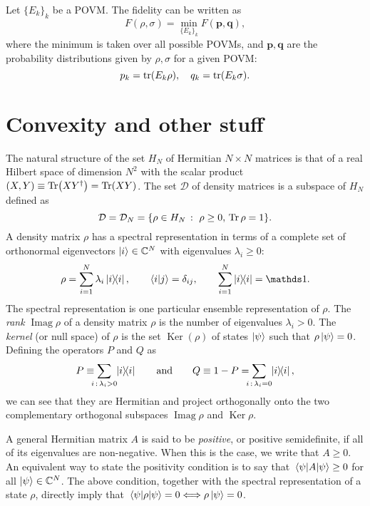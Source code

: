 \documentclass[12pt]{report}
\newcommand{\bs}[1]{\boldsymbol{#1}}
\DeclareMathOperator{\Ker}{Ker}
\DeclareMathOperator{\Imag}{Imag}
\begin{document}
\begin{prop}
	Let $\{E_k\}_k$ be a POVM. The fidelity can be written as
	\begin{equation}
		F(\rho,\sigma)=\min_{\{E_k\}_k} F(\bs p,\bs q),
	\end{equation}
	where the minimum is taken over all possible POVMs, and $\bs p,\bs q$ are the probability distributions given by $\rho,\sigma$ for a given POVM:
	\begin{equation}
		p_k=\tr(E_k \rho),\quad q_k=\tr(E_k \sigma).
	\end{equation}
\end{prop}

\section{Convexity and other stuff}
The natural structure of the set $H_N$ of Hermitian $N\times N$ matrices is that of a real Hilbert space of dimension $N^2$ with the scalar product
$(X, Y) \equiv \Tr(XY^\dagger) = \Tr(XY)$.
The set $\mathcal D$ of density matrices is a subspace of $H_N$ defined as
\begin{equation}
	\mathcal D = \mathcal D_N = \{ \rho \in H_N \,:\,\, \rho \ge 0, \,\Tr\rho=1 \}.
\end{equation}
A density matrix $\rho$ has a spectral representation in terms of a complete set of orthonormal eigenvectors $\ket i \in \mathbb C^N$ with eigenvalues $\lambda_i \ge 0$:
\begin{equation}
	\rho = \sum_{i=1}^N \lambda_i \ketbra{i}{i},
	\qquad
	\braket{i}{j} = \delta_{ij},
	\qquad
	\sum_{i=1}^N \ketbra{i}{i} = \mathds1.
\end{equation}
The spectral representation is one particular ensemble representation of $\rho$.
The \emph{rank} $\Imag\rho$ of a density matrix $\rho$ is the number of eigenvalues $\lambda_i > 0$.
The \emph{kernel} (or null space) of $\rho$ is the set $\Ker(\rho)$ of states $\ket\psi$ such that $\rho\ket\psi = 0$.
Defining the operators $P$ and $Q$ as
\begin{equation}
	P \equiv \sum_{\mathclap{i\,:\,\lambda_i > 0}}\,\, \ketbra{i}{i}
	\qquad\text{and}\qquad
	Q \equiv 1 - P = \sum_{\mathclap{i\,:\,\lambda_i=0}}\,\, \ketbra{i}{i},
\end{equation}
we can see that they are Hermitian and project orthogonally onto the two complementary orthogonal subspaces $\Imag\rho$ and $\Ker\rho$.

A general Hermitian matrix $A$ is said to be \emph{positive}, or positive semidefinite,
if all of its eigenvalues are non-negative.
When this is the case, we write that $A\ge0$.
An equivalent way to state the positivity condition is to say that
$\mel{\psi}{A}{\psi} \ge 0$ for all $\ket\psi\in \mathbb C^N$.
The above condition, together with the spectral representation of a state $\rho$,
directly imply that $\mel{\psi}{\rho}{\psi} = 0 \Longleftrightarrow \rho\ket\psi=0$.
\end{document}
